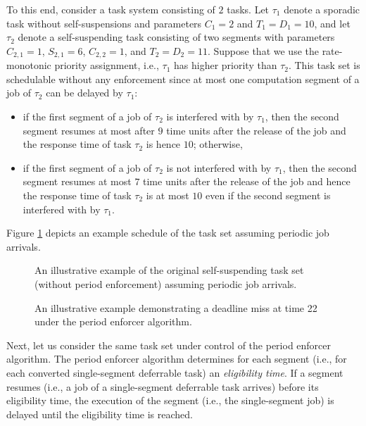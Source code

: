 To this end, consider a task system consisting of $2$ tasks. Let $\tau_1$ denote a sporadic task without self-suspensions and parameters $C_1 = 2$ and $T_1=D_1=10$, and let $\tau_2$ denote a self-suspending task consisting of two segments with parameters  $C_{2,1} = 1$,  $S_{2,1} = 6$, $C_{2,2}=1$, and $ T_2=D_2=11$. Suppose that we use the rate-monotonic priority assignment, i.e., $\tau_1$ has higher priority than $\tau_2$. This task set is schedulable without any enforcement since at most one computation segment of a job of $\tau_2$ can be delayed by $\tau_1$: 
\begin{itemize}
	\item if the first segment of a job of $\tau_2$ is interfered with by $\tau_1$, then the second segment resumes at most after $9$ time units after the release of the job and the response time of task $\tau_2$ is hence $10$; otherwise,
	\item  if the first segment of a job of $\tau_2$ is not interfered with by $\tau_1$, then the second segment resumes at most $7$ time units after the release of the job and hence the  response time of task $\tau_2$ is at most $10$ even if the second segment is interfered with by $\tau_1$.
\end{itemize}
Figure \ref{fig:example-original} depicts an example schedule of the task set assuming periodic job arrivals.


\begin{figure}[t]
  \centering
  
  \caption{An illustrative example of the original self-suspending task set (without period enforcement) assuming periodic job arrivals.}
  \label{fig:example-original}
  \end{figure}
\begin{figure}[t]
  \centering
  
  \caption{An illustrative example demonstrating a deadline miss at time 22
    under the period enforcer algorithm.}
\label{fig:example}  
\end{figure}

Next, let us consider the same task set under control of the period enforcer algorithm.
The period enforcer algorithm determines for each segment (i.e., for each converted single-segment deferrable task) an \emph{eligibility time}. If a segment resumes (i.e., a job of a single-segment deferrable task arrives) before its eligibility time, the execution of the segment (i.e., the single-segment job) is delayed until the eligibility time is reached.

